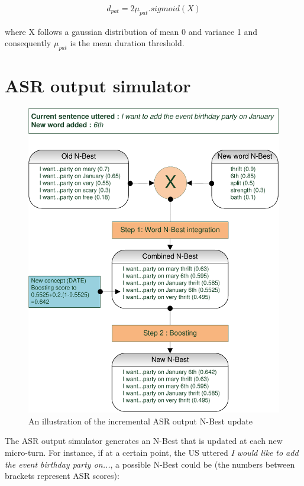        	\begin{eqnarray}
        	d_{pat} = 2 \mu_{pat}.sigmoid(X)
        \end{eqnarray}
        
        where X follows a gaussian distribution of mean 0 and variance 1 and consequently $\mu_{pat}$ is the mean duration threshold.
				
				
\section{ASR output simulator}

\begin{figure}[hb]
          \centering
          \includegraphics[scale=0.8]{figures/ASRSimu.pdf}
          \caption{An illustration of the incremental ASR output N-Best update}
          \label{fig:asrsimu}
        \end{figure}
    
     	The ASR output simulator generates an N-Best that is updated at each new micro-turn. For instance, if at a certain point, the US uttered \textit{I would like to add the event birthday party on...}, a possible N-Best could be (the numbers between brackets represent ASR scores):
        
